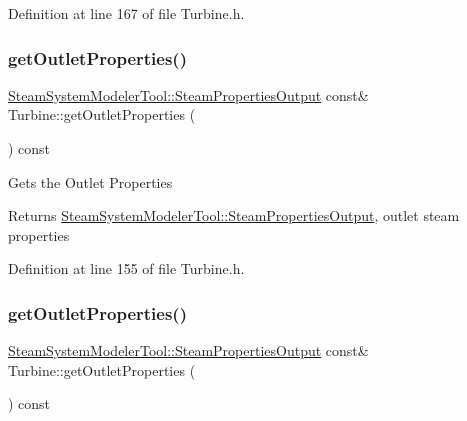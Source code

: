 Definition at line 167 of file Turbine.\+h.

\mbox{\label{class_turbine_aa9449622449e78285a258823ff77c8ec}} 
\subsubsection{\texorpdfstring{get\+Outlet\+Properties()}{getOutletProperties()}\hspace{0.1cm}{\footnotesize\ttfamily [1/3]}}
{\footnotesize\ttfamily \hyperlink{struct_steam_system_modeler_tool_1_1_steam_properties_output}{Steam\+System\+Modeler\+Tool\+::\+Steam\+Properties\+Output} const\& Turbine\+::get\+Outlet\+Properties (\begin{DoxyParamCaption}{ }\end{DoxyParamCaption}) const\hspace{0.3cm}{\ttfamily [inline]}}

Gets the Outlet Properties

\begin{DoxyReturn}{Returns}
\hyperlink{struct_steam_system_modeler_tool_1_1_steam_properties_output}{Steam\+System\+Modeler\+Tool\+::\+Steam\+Properties\+Output}, outlet steam properties 
\end{DoxyReturn}


Definition at line 155 of file Turbine.\+h.

\mbox{\label{class_turbine_aa9449622449e78285a258823ff77c8ec}} 
\subsubsection{\texorpdfstring{get\+Outlet\+Properties()}{getOutletProperties()}\hspace{0.1cm}{\footnotesize\ttfamily [2/3]}}
{\footnotesize\ttfamily \hyperlink{struct_steam_system_modeler_tool_1_1_steam_properties_output}{Steam\+System\+Modeler\+Tool\+::\+Steam\+Properties\+Output} const\& Turbine\+::get\+Outlet\+Properties (\begin{DoxyParamCaption}{ }\end{DoxyParamCaption}) const\hspace{0.3cm}{\ttfamily [inline]}}

